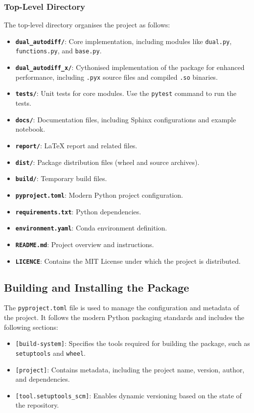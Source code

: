 \documentclass[a4paper,12pt]{article}
\begin{document}
\subsubsection{Top-Level Directory}
The top-level directory organises the project as follows:
\begin{itemize}
    \item \textbf{\texttt{dual\_autodiff/}}: Core implementation, including modules like \texttt{dual.py}, \texttt{functions.py}, and \texttt{base.py}.
    \item \textbf{\texttt{dual\_autodiff\_x/}}: Cythonised implementation of the package for enhanced performance, including \texttt{.pyx} source files and compiled \texttt{.so} binaries.
    \item \textbf{\texttt{tests/}}: Unit tests for core modules. Use the \texttt{pytest} command to run the tests.
    \item \textbf{\texttt{docs/}}: Documentation files, including Sphinx configurations and example notebook.
    \item \textbf{\texttt{report/}}: LaTeX report and related files.
    \item \textbf{\texttt{dist/}}: Package distribution files (wheel and source archives).
    \item \textbf{\texttt{build/}}: Temporary build files.
    \item \textbf{\texttt{pyproject.toml}}: Modern Python project configuration.
    \item \textbf{\texttt{requirements.txt}}: Python dependencies.
    \item \textbf{\texttt{environment.yaml}}: Conda environment definition.
    \item \textbf{\texttt{README.md}}: Project overview and instructions.
    \item \textbf{\texttt{LICENCE}}: Contains the MIT License under which the project is distributed.
\end{itemize}



\subsection{Building and Installing the Package}
The \texttt{pyproject.toml} file is used to manage the configuration and metadata of the project. It follows the modern Python packaging standards and includes the following sections:
\begin{itemize}
    \item \texttt{[build-system]}: Specifies the tools required for building the package, such as \texttt{setuptools} and \texttt{wheel}.
    \item \texttt{[project]}: Contains metadata, including the project name, version, author, and dependencies.
    \item \texttt{[tool.setuptools\_scm]}: Enables dynamic versioning based on the state of the repository.
\end{itemize}
\end{document}
